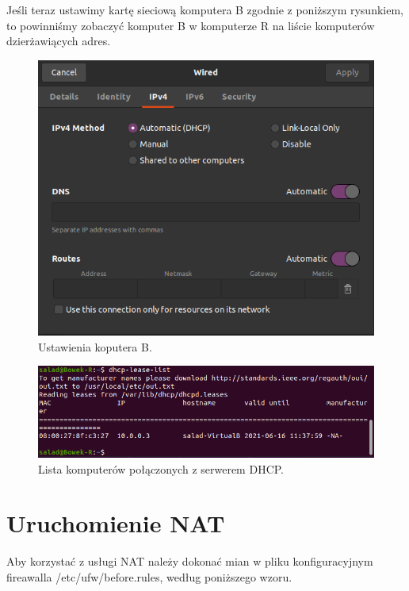 \documentclass{article}
\begin{document}
Jeśli teraz ustawimy kartę sieciową komputera B zgodnie z poniższym rysunkiem, to powinniśmy zobaczyć komputer B w komputerze R na liście komputerów dzierżawiących adres.

\begin{figure}[H]
    \centering
    \includegraphics[scale = 0.8]{dhcp/dhcp_lease_dowody.png}  
    \caption{Ustawienia koputera B.}
    \label{2}
\end{figure}

\begin{figure}[H]
    \centering
    \includegraphics[scale = 0.68]{dhcp/dhcp_lease.png}  
    \caption{Lista komputerów połączonych z serwerem DHCP.}
    \label{2}
\end{figure}
\newpage
\section{Uruchomienie NAT }
Aby korzystać z usługi NAT należy dokonać mian w pliku konfiguracyjnym fireawalla /etc/ufw/before.rules, według poniższego wzoru. 
\end{document}
